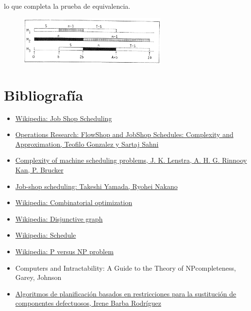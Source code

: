 \documentclass[11pt, a4paper,spanish]{article}
\begin{document}
					lo que completa la prueba de equivalencia.
					
					\begin{figure}[H]
						\centering
						\includegraphics[width=75mm]{res/example2.png}
					\end{figure}

	\newpage

		\section{Bibliografía}

			\begin{itemize}
			
				\item \href{https://en.wikipedia.org/wiki/Job_shop_scheduling}{Wikipedia: Job Shop Scheduling}
				\item \href{http://www.rspq.org/pubs/gonz.pdf}{Operations Research: FlowShop and JobShop Schedules: Complexity and Approximation, Teofilo Gonzalez y Sartaj Sahni}
				\item \href{http://oai.cwi.nl/oai/asset/18051/18051A.pdf}{Complexity of machine scheduling problems, J. K. Lenstra, A. H. G. Rinnooy Kan, P. Brucker}
				\item \href{http://www.kecl.ntt.co.jp/as/members/yamada/galbk.pdf}{Job-shop scheduling: Takeshi Yamada, Ryohei Nakano}
				\item \href{https://en.wikipedia.org/wiki/Combinatorial_optimization}{Wikipedia: Combinatorial optimization}
				\item \href{https://en.wikipedia.org/wiki/Disjunctive_graph}{Wikipedia: Disjunctive graph}
				\item \href{https://en.wikipedia.org/wiki/Schedule_(computer_science)}{Wikipedia: Schedule}
				\item \href{https://en.wikipedia.org/wiki/P_versus_NP_problem}{Wikipedia: P versus NP problem}
				\item {Computers and Intractability: A Guide to the Theory of NPcompleteness, Garey, Johnson}
				\item \href{https://www.lsi.us.es/docs/doctorado/memorias/MemoInvestigIreneBarba.pdf}{Algoritmos de planificación basados en restricciones para la sustitución de componentes defectuosos, Irene Barba Rodríguez}

			\end{itemize}
\end{document}
